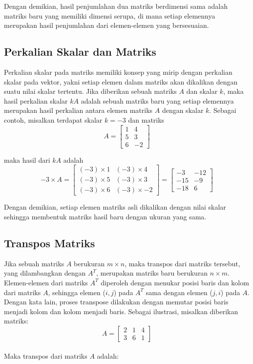 \documentclass[a4paper,12pt]{report}
\numberwithin{equation}{chapter}
\begin{document}
Dengan demikian, hasil  penjumlahan dua matriks berdimensi sama adalah matriks baru yang memiliki dimensi serupa, di mana setiap elemennya merupakan hasil penjumlahan dari elemen-elemen yang bersesuaian.

\subsection{Perkalian Skalar dan Matriks}
Perkalian skalar pada matriks memiliki konsep yang mirip dengan perkalian skalar pada vektor, yakni setiap elemen dalam matriks akan dikalikan dengan suatu nilai skalar tertentu. Jika diberikan sebuah matriks $A$ dan skalar $k$, maka hasil perkalian skalar $kA$ adalah sebuah matriks baru yang setiap elemennya merupakan hasil perkalian antara elemen matriks $A$ dengan skalar $k$. Sebagai contoh, misalkan terdapat skalar $k = -3$ dan matriks \[
A = \begin{bmatrix}
    1 & 4\\
    5 & 3\\
    6 & -2
\end{bmatrix}
\]

maka hasil dari $kA$ adalah
\[
-3 \times A = \begin{bmatrix}
    (-3) \times 1 & (-3) \times 4\\
    (-3) \times 5 & (-3) \times 3\\
    (-3) \times 6 & (-3) \times -2
\end{bmatrix} = \begin{bmatrix}
    -3 & -12\\
    -15 & -9\\
    -18 & 6
\end{bmatrix}
\]

Dengan demikian, setiap elemen matriks asli dikalikan dengan nilai skalar sehingga membentuk matriks hasil baru dengan ukuran yang sama.

\subsection{Transpos Matriks}
Jika sebuah matriks $A$ berukuran $m \times n$, maka transpos dari matriks tersebut, yang dilambangkan dengan $A^T$, merupakan matriks baru berukuran $n \times m$. Elemen-elemen dari matriks $A^T$ diperoleh dengan menukar posisi baris dan kolom dari matriks $A$, sehingga elemen ($i,j$) pada $A^T$ sama dengan elemen ($j,i$) pada $A$. Dengan kata lain, proses transpose dilakukan dengan memutar posisi baris menjadi kolom dan kolom menjadi baris. Sebagai ilustrasi, misalkan diberikan matriks:
\[
A = \begin{bmatrix}
    2 & 1 & 4\\
    3 & 6 & 1
\end{bmatrix}
\]
\\
Maka transpos dari matriks $A$ adalah:
\end{document}
